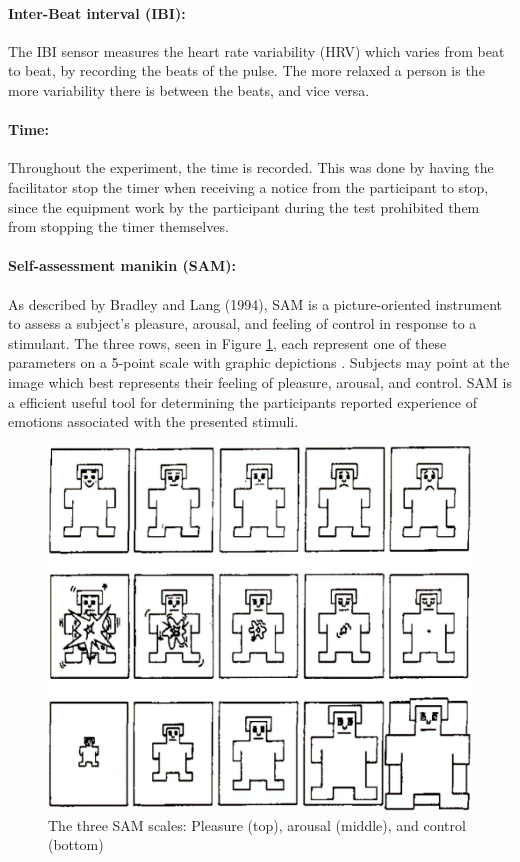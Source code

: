 \paragraph{Inter-Beat interval (IBI):} The IBI sensor measures the heart rate variability (HRV) which varies from beat to beat, by recording the beats of the pulse. The more relaxed a person is the more variability there is between the beats, and vice versa. 
\paragraph{Time:} Throughout the experiment, the time is recorded. This was done by having the facilitator stop the timer when receiving a notice from the participant to stop, since the equipment work by the participant during the test prohibited them from stopping the timer themselves.
\paragraph{Self-assessment manikin (SAM):} As described by Bradley and Lang (1994), SAM is a picture-oriented instrument to assess a subject’s pleasure, arousal, and feeling of control in response to a stimulant. The three rows, seen in Figure \ref{fig:SAM}, each represent one of these parameters on a 5-point scale with graphic depictions \cite{Bradley1994}. Subjects may point at the image which best represents their feeling of pleasure, arousal, and control. SAM is a efficient useful tool for determining the participants reported experience of emotions associated with the presented stimuli. 

\begin{figure}[h!]
    \centering
    \includegraphics[width=\textwidth]{figures/SAM.png}
    \caption{The three SAM scales: Pleasure (top), arousal (middle), and control (bottom) \cite{Bradley1994}}\label{fig:SAM}
\end{figure}

